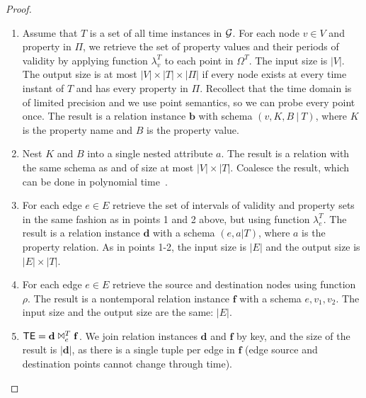 \begin{proof}
\begin{enumerate}[itemindent=\dimexpr\labelwidth+\labelsep\relax,leftmargin=0pt]
\item Assume that $T$ is a set of all time instances in ${\cal G}$.
  For each node $v \in V$ and property in $\Pi$, we retrieve the set
  of property values and their periods of validity by applying
  function $\lambda^T_v$ to each point in $\Omega^T$.  The input size is
  $|V|$.  The output size is at most $|V|\times|T|\times|\Pi|$ if
  every node exists at every time instant of $T$ and has every
  property in $\Pi$.  Recollect that the time domain is of limited
  precision and we use point semantics, so we can probe every point
  once.  The result is
  a relation instance $\mathbf{b}$ with schema $(v, K, B~|~T)$, where
  $K$ is the property name and $B$ is the property value.
\item Nest $K$ and $B$ into a single nested attribute $a$.  The result
  is a relation with the same schema as \tv and of size at most $|V|
  \times |T|$.  Coalesce the result, which can be done in polynomial time~\cite{DBLP:conf/vldb/BohlenSS96}.
\item For each edge $e \in E$ retrieve the set of intervals of
  validity and property sets in the same fashion as in points 1 and 2
  above, but using function $\lambda^T_e$.  The result is a relation
  instance $\mathbf{d}$ with a schema $(e, a|T)$, where $a$ is the
  property relation.  As in points 1-2, the input size is $|E|$ and
  the output size is $|E| \times |T|$.
\item For each edge $e \in E$ retrieve the source and destination
  nodes using function $\rho$.  The result is a nontemporal relation
  instance $\mathbf{f}$ with a schema $e, v_1, v_2$.  The input size
  and the output size are the same: $|E|$.
\item $\textsf{TE} = \mathbf{d} \Join^T_e \mathbf{f}$.  We join relation
  instances $\mathbf{d}$ and $\mathbf{f}$ by key, and the size of the
  result is $|\mathbf{d}|$, as there is a single tuple per edge in
  $\mathbf{f}$ (edge source and destination points cannot change
  through time).
\end{enumerate}


\end{proof}
